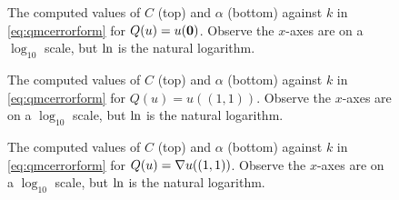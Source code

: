 \begin{figure}[h]
    \centering
    \begin{subfigure}{\textwidth}
            \centering

  \end{subfigure}
    \begin{subfigure}{\textwidth}
                \centering

    \end{subfigure}

\caption[The computed Quasi-Monte-Carlo convergence rate for $Q(u) =  u(\bzero)$.]{The computed values of $C$ (top) and $\alpha$ (bottom) against $k$ in \cref{eq:qmcerrorform} for $Q(u) =  u(\bzero)$. Observe the $x$-axes are on a $\log_{10}$ scale, but $\operatorname{ln}$ is the natural logarithm. \label{fig:originCalpha}}
\end{figure}

\begin{figure}[h]
    \centering
    \begin{subfigure}{\textwidth}
            \centering

  \end{subfigure}
    \begin{subfigure}{\textwidth}
            \centering

    \end{subfigure}
\caption[The computed Quasi-Monte-Carlo convergence rate for $Q(u) =  u(1,1)$.]{The computed values of $C$ (top) and $\alpha$ (bottom) against $k$ in \cref{eq:qmcerrorform} for $Q(u) = u((1,1))$. Observe the $x$-axes are on a $\log_{10}$ scale, but $\operatorname{ln}$ is the natural logarithm.  \label{fig:toprightCalpha}}
\end{figure}

\begin{figure}[h]
    \centering
    \begin{subfigure}{\textwidth}
            \centering

  \end{subfigure}
    \begin{subfigure}{\textwidth}
            \centering 

    \end{subfigure}
\caption[The computed Quasi-Monte-Carlo convergence rate for $Q(u) =  \gradu(1,1)$.]{The computed values of $C$ (top) and $\alpha$ (bottom) against $k$ in \cref{eq:qmcerrorform} for $Q(u) = \nabla u((1,1))$. Observe the $x$-axes are on a $\log_{10}$ scale, but $\operatorname{ln}$ is the natural logarithm.  \label{fig:gradienttoprightCalpha}}
\end{figure}



